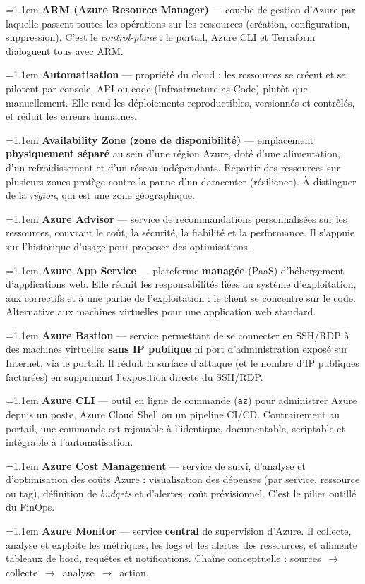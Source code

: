 \documentclass[11pt,a4paper]{article}
\newcommand{\arr}{\,$\rightarrow$\,}
\newcommand{\co}[1]{\texttt{\small #1}}
\newcommand{\df}[2]{%
  \par\addvspace{4pt}\needspace{2\baselineskip}%
  \hangindent=1.1em\hangafter=1
  {\sffamily\bfseries\color{azuredark}#1} — #2\par}
\begin{document}
\df{ARM (Azure Resource Manager)}{couche de gestion d'Azure par laquelle passent toutes les opérations sur les ressources (création, configuration, suppression). C'est le \emph{control-plane} : le portail, Azure CLI et Terraform dialoguent tous avec ARM.}

\df{Automatisation}{propriété du cloud : les ressources se créent et se pilotent par console, API ou code (Infrastructure as Code) plutôt que manuellement. Elle rend les déploiements reproductibles, versionnés et contrôlés, et réduit les erreurs humaines.}

\df{Availability Zone (zone de disponibilité)}{emplacement \textbf{physiquement séparé} au sein d'une région Azure, doté d'une alimentation, d'un refroidissement et d'un réseau indépendants. Répartir des ressources sur plusieurs zones protège contre la panne d'un datacenter (résilience). À distinguer de la \emph{région}, qui est une zone géographique.}

\df{Azure Advisor}{service de recommandations personnalisées sur les ressources, couvrant le coût, la sécurité, la fiabilité et la performance. Il s'appuie sur l'historique d'usage pour proposer des optimisations.}

\df{Azure App Service}{plateforme \textbf{managée} (PaaS) d'hébergement d'applications web. Elle réduit les responsabilités liées au système d'exploitation, aux correctifs et à une partie de l'exploitation : le client se concentre sur le code. Alternative aux machines virtuelles pour une application web standard.}

\df{Azure Bastion}{service permettant de se connecter en SSH/RDP à des machines virtuelles \textbf{sans IP publique} ni port d'administration exposé sur Internet, via le portail. Il réduit la surface d'attaque (et le nombre d'IP publiques facturées) en supprimant l'exposition directe du SSH/RDP.}

\df{Azure CLI}{outil en ligne de commande (\co{az}) pour administrer Azure depuis un poste, Azure Cloud Shell ou un pipeline CI/CD. Contrairement au portail, une commande est rejouable à l'identique, documentable, scriptable et intégrable à l'automatisation.}

\df{Azure Cost Management}{service de suivi, d'analyse et d'optimisation des coûts Azure : visualisation des dépenses (par service, ressource ou tag), définition de \emph{budgets} et d'alertes, coût prévisionnel. C'est le pilier outillé du FinOps.}

\df{Azure Monitor}{service \textbf{central} de supervision d'Azure. Il collecte, analyse et exploite les métriques, les logs et les alertes des ressources, et alimente tableaux de bord, requêtes et notifications. Chaîne conceptuelle : sources \arr{} collecte \arr{} analyse \arr{} action.}
\end{document}
